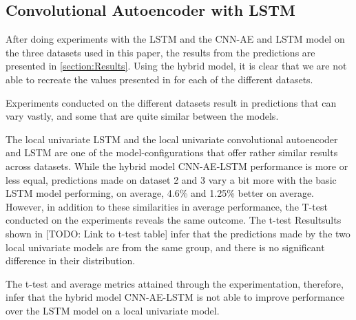 
\subsection{Convolutional Autoencoder with LSTM}
\label{section:Discussion:Discussion:CNN-AE-LSTM}






After doing experiments with the LSTM and the CNN-AE and LSTM model on the three datasets used in this paper,
the results from the predictions are presented in \cref{section:Results}.
Using the hybrid model, it is clear that we are not able to recreate the values presented in \cite{Zhao2019}
for each of the different datasets.

Experiments conducted on the different datasets result in predictions that can vary vastly,
and some that are quite similar between the models.

The local univariate LSTM and the local univariate convolutional autoencoder and LSTM are one of the model-configurations
that offer rather similar results across datasets.
While the hybrid model CNN-AE-LSTM performance is more or less equal, predictions made on dataset 2 and 3 vary a bit more
with the basic LSTM model performing, on average, 4.6\% and 1.25\% better on average.
However, in addition to these similarities in average performance, the T-test conducted on the experiments reveals the same outcome.
The t-test Resultsults shown in [TODO: Link to t-test table] infer that the predictions made by the two local univariate models
are from the same group, and there is no significant difference in their distribution.

The t-test and average metrics attained through the experimentation, therefore, infer that the hybrid model CNN-AE-LSTM
is not able to improve performance over the LSTM model on a local univariate model.



